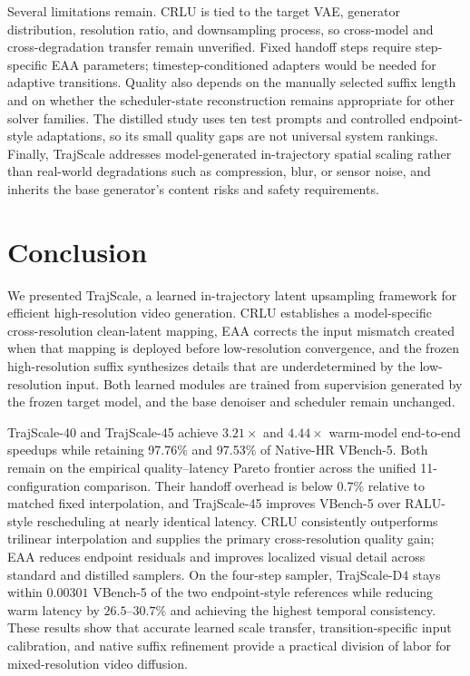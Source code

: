 Several limitations remain. CRLU is tied to the target VAE, generator
distribution, resolution ratio, and downsampling process, so cross-model and
cross-degradation transfer remain unverified. Fixed handoff steps require
step-specific EAA parameters; timestep-conditioned adapters would be needed for
adaptive transitions. Quality also depends on the manually selected suffix
length and on whether the scheduler-state reconstruction remains appropriate
for other solver families. The distilled study uses ten test prompts and
controlled endpoint-style adaptations, so its small quality gaps are not
universal system rankings. Finally, TrajScale addresses model-generated
in-trajectory spatial scaling rather than real-world degradations such as
compression, blur, or sensor noise, and inherits the base generator's content
risks and safety requirements.

\section{Conclusion}

We presented TrajScale, a learned in-trajectory latent upsampling framework for
efficient high-resolution video generation. CRLU establishes a model-specific
cross-resolution clean-latent mapping, EAA corrects the input mismatch created
when that mapping is deployed before low-resolution convergence, and the
frozen high-resolution suffix synthesizes details that are underdetermined by
the low-resolution input. Both learned modules are trained from supervision
generated by the frozen target model, and the base denoiser and scheduler remain
unchanged.

TrajScale-40 and TrajScale-45 achieve \(3.21\times\) and \(4.44\times\)
warm-model end-to-end speedups while retaining 97.76\% and 97.53\% of
Native-HR VBench-5. Both remain on the empirical quality--latency Pareto
frontier across the unified 11-configuration comparison. Their handoff
overhead is below 0.7\% relative to matched fixed interpolation, and
TrajScale-45 improves VBench-5 over RALU-style rescheduling at nearly identical
latency. CRLU consistently outperforms trilinear interpolation and supplies
the primary cross-resolution quality gain; EAA reduces endpoint residuals and
improves localized visual detail across standard and distilled samplers. On
the four-step sampler, TrajScale-D4 stays within \(0.00301\) VBench-5 of the
two endpoint-style references while reducing warm latency by
\(26.5\)--\(30.7\%\) and achieving the highest temporal consistency. These
results show that accurate learned scale transfer, transition-specific input
calibration, and native suffix refinement provide a practical division of
labor for mixed-resolution video diffusion.
